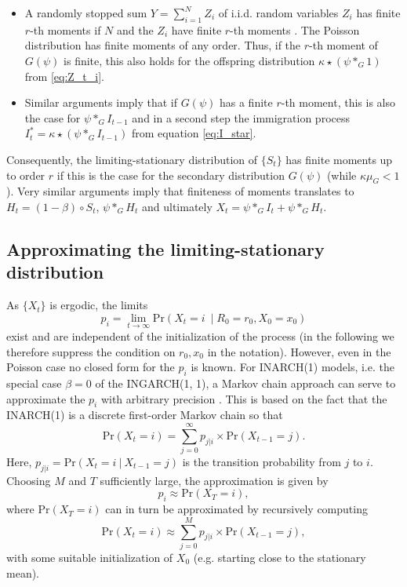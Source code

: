 \documentclass{article}
\begin{document}
\begin{itemize}
\item A randomly stopped sum $Y = \sum_{i = 1}^N Z_i$ of i.i.d. random variables $Z_i$ has finite $r$-th moments if $N$ and the $Z_i$ have finite $r$-th moments \cite[Theorem 5.2]{Gut2009}. The Poisson distribution has finite moments of any order. Thus, if the $r$-th moment of $G(\psi)$ is finite, this also holds for the offspring distribution $\kappa \star (\psi *_G 1)$ from \eqref{eq:Z_t_i}.
\item Similar arguments imply that if $G(\psi)$ has a finite $r$-th moment, this is also the case for $\psi *_G I_{t - 1}$ and in a second step the immigration process $I^*_t = \kappa \star(\psi *_G I_{t - 1})$ from equation \eqref{eq:I_star}.
\end{itemize}
Consequently, the limiting-stationary distribution of $\{S_t\}$ has finite moments up to order $r$ if this is the case for the secondary distribution $G(\psi)$ (while $\kappa\mu_G < 1$). Very similar arguments imply that finiteness of moments translates to $H_t = (1 - \beta) \circ S_t$, $\psi *_G H_t$ and ultimately $X_t = \psi *_G I_t + \psi *_G H_t$.
%
%

\subsection{Approximating the limiting-stationary distribution}

As $\{X_t\}$ is ergodic, the limits
$$
p_i = \lim_{t \rightarrow \infty} \text{Pr}(X_t = i \ \mid R_0 = r_0, X_0 = x_0)
$$
exist and are independent of the initialization of the process (in the following we therefore suppress the condition on $r_0, x_0$ in the notation). However, even in the Poisson case no closed form for the $p_i$ is known. For INARCH(1) models, i.e. the special case $\beta = 0$ of the INGARCH(1, 1), a Markov chain approach can serve to approximate the $p_i$ with arbitrary precision \cite{Weiss2010}. This is based on the fact that the INARCH(1) is a discrete first-order Markov chain so that
$$
\text{Pr}(X_t = i) = \sum_{j = 0}^\infty p_{j|i} \times \text{Pr}(X_{t - 1} = j).
$$
Here, $p_{j|i} = \text{Pr}(X_t = i \ | \ X_{t - 1} = j) $ is the transition probability from $j$ to $i$. Choosing $M$ and $T$ sufficiently large, the approximation is given by
$$
p_i \approx \text{Pr}(X_T = i),
$$
where $\text{Pr}(X_T = i)$ can in turn be approximated by recursively computing
$$
\text{Pr}(X_t = i) \approx \sum_{j = 0}^M p_{j|i} \times \text{Pr}(X_{t - 1} = j),
$$
with some suitable initialization of $X_0$ (e.g. starting close to the stationary mean).
\end{document}
